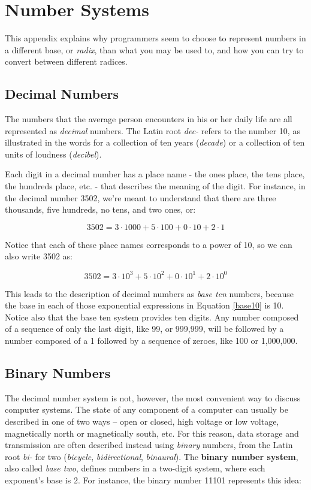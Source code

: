 
\chapter{Number Systems}
\label{appendix:numbersystems}

\minitoc

This appendix explains why programmers seem to choose to represent numbers in a different base, or \textit{radix}, than what you may be used to, and how you can try to convert between different radices.

\setcounter{section}{9}
\section{Decimal Numbers}
The numbers that the average person encounters in his or her daily life are all represented as \textit{decimal} numbers.  The Latin root \textit{dec-} refers to the number 10, as illustrated in the words for a collection of ten years (\textit{decade}) or a collection of ten units of loudness (\textit{decibel}).

Each digit in a decimal number has a place name - the ones place, the tens place, the hundreds place, etc. - that describes the meaning of the digit.  For instance, in the decimal number 3502, we're meant to understand that there are three thousands, five hundreds, no tens, and two ones, or:

\[ 3502 = 3 \cdot 1000 + 5 \cdot 100 + 0 \cdot 10 + 2 \cdot 1 \]

Notice that each of these place names corresponds to a power of 10, so we can also write 3502 as:

\begin{equation}\label{base10}3502 = 3 \cdot 10^3 + 5 \cdot 10^2 + 0 \cdot 10^1 + 2 \cdot 10^0\end{equation}

This leads to the description of decimal numbers as \textit{base ten} numbers, because the base in each of those exponential expressions in Equation \ref{base10} is 10.  Notice also that the base ten system provides ten digits.  Any number composed of a sequence of only the last digit, like 99, or 999,999, will be followed by a number composed of a 1 followed by a sequence of zeroes, like 100 or 1,000,000.

\setcounter{section}{1}
\section{Binary Numbers}
The decimal number system is not, however, the most convenient way to discuss computer systems.  The state of any component of a computer can usually be described in one of two ways -- open or closed, high voltage or low voltage, magnetically north or magnetically south, etc.  For this reason, data storage and transmission are often described instead using \textit{binary} numbers, from the Latin root \textit{bi-} for two (\textit{bicycle}, \textit{bidirectional}, \textit{binaural}).  The \textbf{binary number system}, also called \textit{base two}, defines numbers in a two-digit system, where each exponent's base is 2.  For instance, the binary number 11101 represents this idea:

